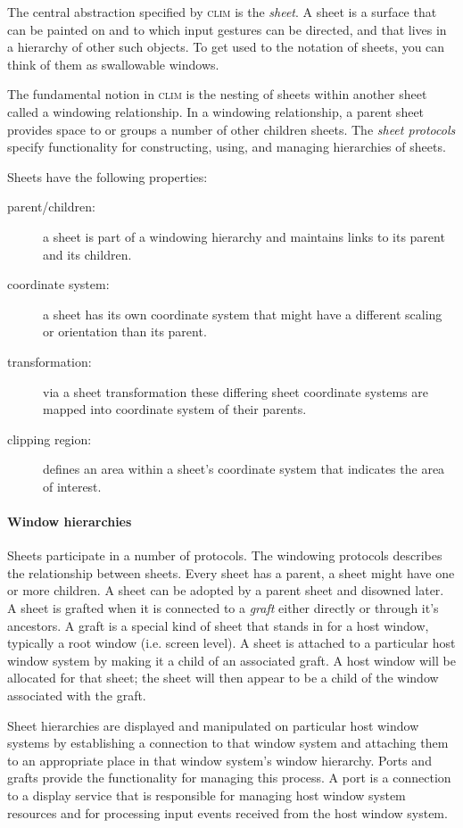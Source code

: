 \documentclass[twocolumn,a4paper]{article}
\newcommand {\concept} [1] {{\sl #1}\index{#1}}
\newcommand {\CLIM}{\textsc{clim}}
\begin{document}
The central abstraction specified by \CLIM{} is the \concept{sheet}. A
sheet is a surface that can be painted on and to which input gestures
can be directed, and that lives in a hierarchy of other such objects.
To get used to the notation of sheets, you can think of them as
swallowable windows.

The fundamental notion in \CLIM{} is the nesting of sheets within
another sheet called a windowing relationship. In a windowing
relationship, a parent sheet provides space to or groups a number of
other children sheets. The \concept{sheet protocols} specify
functionality for constructing, using, and managing hierarchies of
sheets.

Sheets have the following properties:
\begin{description}
\item[parent/children:] a sheet is part of a windowing hierarchy and
  maintains links to its parent and its children.
\item[coordinate system:] a sheet has its own coordinate system that
  might have a different scaling or orientation than its parent.
\item[transformation:] via a sheet transformation these differing
  sheet coordinate systems are mapped into coordinate system of their
  parents.
\item[clipping region:] defines an area within a sheet's coordinate
  system that indicates the area of interest.
\end{description}

\paragraph*{Window hierarchies} Sheets participate in a number of
protocols. The windowing protocols describes the relationship between
sheets. Every sheet has a parent, a sheet might have one or more
children. A sheet can be adopted by a parent sheet and disowned later.
A sheet is grafted when it is connected to a \concept{graft} either
directly or through it's ancestors. A graft is a special kind of sheet
that stands in for a host window, typically a root window (i.e.{} screen
level). A sheet is attached to a particular host window system by
making it a child of an associated graft. A host window will be
allocated for that sheet; the sheet will then appear to be a child of
the window associated with the graft.

Sheet hierarchies are displayed and manipulated on particular host
window systems by establishing a connection to that window system and
attaching them to an appropriate place in that window system's window
hierarchy. Ports and grafts provide the functionality for managing
this process. A port is a connection to a display service that is
responsible for managing host window system resources and for
processing input events received from the host window system.
\end{document}
